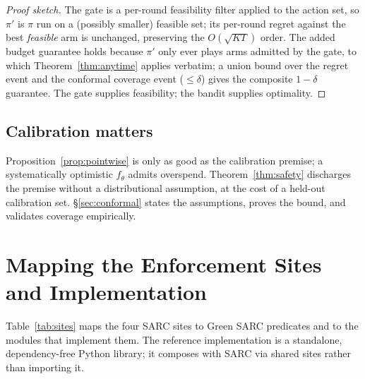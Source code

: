 \documentclass[11pt]{article}
\theoremstyle{plain}
\theoremstyle{definition}
\theoremstyle{remark}
\begin{document}
\begin{proof}[Proof sketch]
The gate is a per-round feasibility filter applied to the action set, so $\pi'$ is $\pi$ run on a (possibly smaller) feasible set; its per-round regret against the best \emph{feasible} arm is unchanged, preserving the $O(\sqrt{KT})$ order. The added budget guarantee holds because $\pi'$ only ever plays arms admitted by the gate, to which Theorem~\ref{thm:anytime} applies verbatim; a union bound over the regret event and the conformal coverage event ($\le\delta$) gives the composite $1-\delta$ guarantee. The gate supplies feasibility; the bandit supplies optimality. \end{proof}

\subsection{Calibration matters}\label{sec:calib-pointer}
Proposition~\ref{prop:pointwise} is only as good as the calibration premise; a systematically optimistic $\hat f_\theta$ admits overspend. Theorem~\ref{thm:safety} discharges the premise without a distributional assumption, at the cost of a held-out calibration set. \S\ref{sec:conformal} states the assumptions, proves the bound, and validates coverage empirically.

\section{Mapping the Enforcement Sites and Implementation}\label{sec:sites}

Table~\ref{tab:sites} maps the four SARC sites to Green SARC predicates and to the modules that implement them. The reference implementation is a standalone, dependency-free Python library; it composes with SARC via shared sites rather than importing it.
\end{document}
